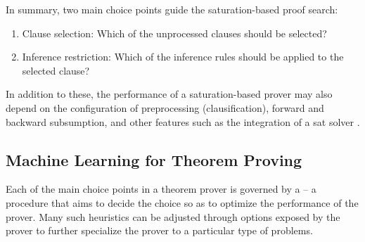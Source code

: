 In summary, two main choice points guide the \gls{saturation}-based proof search:
\begin{enumerate}
\item Clause selection: Which of the unprocessed clauses should be selected?
\item Inference restriction: Which of the inference rules should be applied to the selected clause?
\end{enumerate}

In addition to these, the performance of a saturation-based prover may also depend on the configuration of preprocessing (clausification), forward and backward subsumption, and other features such as the integration of a \gls{sat} solver \cite{}.


\subsection{Machine Learning for Theorem Proving}


Each of the main choice points in a theorem prover is governed by a  -- a procedure that aims to decide the choice so as to optimize the performance of the prover.
Many such heuristics can be adjusted through options exposed by the prover to further specialize the prover to a particular type of problems.

